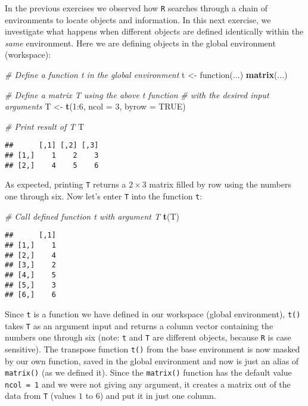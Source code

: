 \documentclass[11,]{article}
\newenvironment{Shaded}{\begin{snugshade}}{\end{snugshade}}
\newcommand{\KeywordTok}[1]{\textcolor[rgb]{0.13,0.29,0.53}{\textbf{{#1}}}}
\newcommand{\DataTypeTok}[1]{\textcolor[rgb]{0.13,0.29,0.53}{{#1}}}
\newcommand{\DecValTok}[1]{\textcolor[rgb]{0.00,0.00,0.81}{{#1}}}
\newcommand{\StringTok}[1]{\textcolor[rgb]{0.31,0.60,0.02}{{#1}}}
\newcommand{\CommentTok}[1]{\textcolor[rgb]{0.56,0.35,0.01}{\textit{{#1}}}}
\newcommand{\OtherTok}[1]{\textcolor[rgb]{0.56,0.35,0.01}{{#1}}}
\newcommand{\NormalTok}[1]{{#1}}
\begin{document}
In the previous exercises we observed how \texttt{R} searches through a
chain of environments to locate objects and information. In this next
exercise, we investigate what happens when different objects are defined
identically within the \emph{same} environment. Here we are defining
objects in the global environment (workspace):

\begin{Shaded}
\begin{Highlighting}[]
\CommentTok{# Define a function t in the global environment}
\NormalTok{t <-}\StringTok{ }\NormalTok{function(...) }\KeywordTok{matrix}\NormalTok{(...)}

\CommentTok{# Define a matrix T using the above t function}
\CommentTok{# with the desired input arguments}
\NormalTok{T <-}\StringTok{ }\KeywordTok{t}\NormalTok{(}\DecValTok{1}\NormalTok{:}\DecValTok{6}\NormalTok{, }\DataTypeTok{ncol =} \DecValTok{3}\NormalTok{, }\DataTypeTok{byrow =} \OtherTok{TRUE}\NormalTok{)}

\CommentTok{# Print result of T}
\NormalTok{T}
\end{Highlighting}
\end{Shaded}

\begin{verbatim}
##      [,1] [,2] [,3]
## [1,]    1    2    3
## [2,]    4    5    6
\end{verbatim}

As expected, printing \texttt{T} returns a \(2 \times 3\) matrix filled
by row using the numbers one through six. Now let's enter \texttt{T}
into the function \texttt{t}:

\begin{Shaded}
\begin{Highlighting}[]
\CommentTok{# Call defined function t with argument T}
\KeywordTok{t}\NormalTok{(T)}
\end{Highlighting}
\end{Shaded}

\begin{verbatim}
##      [,1]
## [1,]    1
## [2,]    4
## [3,]    2
## [4,]    5
## [5,]    3
## [6,]    6
\end{verbatim}

Since \texttt{t} is a function we have defined in our workspace (global
environment), \texttt{t()} takes \texttt{T} as an argument input and
returns a column vector containing the numbers one through six (note:
\texttt{t} and \texttt{T} are different objects, because \texttt{R} is
case sensitive). The transpose function \texttt{t()} from the base
environment is now masked by our own function, saved in the global
environment and now is just an alias of \texttt{matrix()} (as we defined
it). Since the \texttt{matrix()} function has the default value
\texttt{ncol = 1} and we were not giving any argument, it creates a
matrix out of the data from \texttt{T} (values \(1\) to \(6\)) and put
it in just one column.
\end{document}
